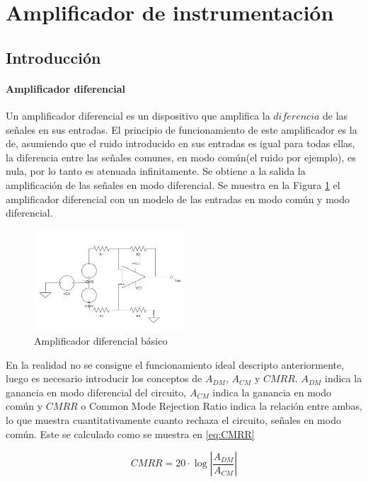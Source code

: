 \section{Amplificador de instrumentaci\'on} 
\subsection{Introducci\'on}
\paragraph{Amplificador diferencial}
Un amplificador diferencial es un dispositivo que amplifica la $\textit{diferencia}$ de las se\~nales en sus entradas. El principio de funcionamiento de este amplificador es la de, asumiendo que el ruido introducido en sus entradas es igual para todas ellas,  la diferencia entre las se\~nales comunes, en modo com\'un(el ruido por ejemplo), es nula, por lo tanto es atenuada infinitamente. Se obtiene a la salida la amplificaci\'on de las se\~nales en modo diferencial.
Se muestra en la Figura \ref{fig:AMP_DIF}  el amplificador diferencial con un modelo de las entradas en modo com\'un y modo diferencial.
\begin{figure}[H]

    \centering
    \includegraphics[width=0.5\textwidth]{../EJ3/Recursos/AMP_DIF}
    \caption{Amplificador diferencial b\'asico}
    \label{fig:AMP_DIF}
\end{figure}

En la realidad no se consigue el funcionamiento ideal descripto anteriormente, luego es necesario introducir los conceptos de $A_{DM}$, $A_{CM}$ y $CMRR$. $A_{DM}$ indica la ganancia en modo diferencial del circuito, $A_{CM}$ indica la ganancia en modo com\'un y $CMRR$ o Common Mode Rejection Ratio indica la relaci\'on entre ambas, lo que muestra cuantitativamente cuanto rechaza el circuito, se\~nales en modo com\'un. Este se calculado como se muestra en \ref{eq:CMRR}

 \begin{equation}
    CMRR=20 \cdot \log \left| \frac{A_{DM}}{A_{CM}} \right|
    \label{eq:CMRR}
 \end{equation}
